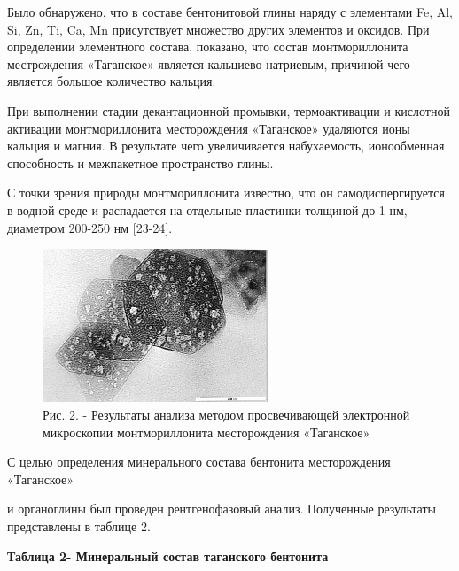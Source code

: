 \begin{multicols}{2}
Было обнаружено, что в составе бентонитовой глины наряду с элементами
Fe, Al, Si, Zn, Ti, Ca, Mn присутствует множество других элементов и
оксидов. При определении элементного состава, показано, что состав
монтмориллонита местрождения «Таганское» является кальциево-натриевым,
причиной чего является большое количество кальция.

При выполнении стадии декантационной промывки, термоактивации и
кислотной активации монтмориллонита месторождения «Таганское» удаляются
ионы кальция и магния. В результате чего увеличивается набухаемость,
ионообменная способность и межпакетное пространство глины.

С точки зрения природы монтмориллонита известно, что он
самодиспергируется в водной среде и распадается на отдельные пластинки
толщиной до 1 нм, диаметром 200-250 нм {[}23-24{]}.
\end{multicols}

\begin{figure}[H]
	\centering
	\includegraphics[width=0.6\textwidth]{assets/1015}
	\caption*{Рис. 2. - Результаты анализа методом просвечивающей электронной микроскопии монтмориллонита месторождения «Таганское»}
\end{figure}

С целью определения минерального состава бентонита месторождения
«Таганское»

и органоглины был проведен рентгенофазовый анализ. Полученные результаты
представлены в таблице 2.

{\bfseries Таблица 2- Минеральный состав таганского бентонита}

